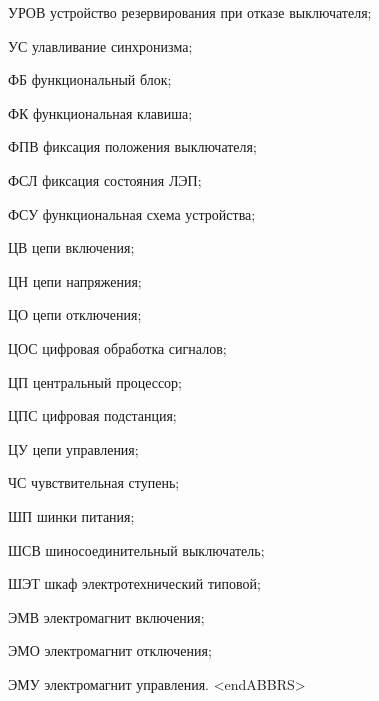 \begin{list}{}
\item[УРОВ] устройство резервирования при отказе выключателя;
\item[УС] улавливание синхронизма;
\item[ФБ] функциональный блок;
\item[ФК] функциональная клавиша;
\item[ФПВ] фиксация положения выключателя;
\item[ФСЛ] фиксация состояния ЛЭП;
\item[ФСУ] функциональная схема устройства;
\item[ЦВ] цепи включения;
\item[ЦН] цепи напряжения;
\item[ЦО] цепи отключения;
\item[ЦОС] цифровая обработка сигналов;
\item[ЦП] центральный процессор;
\item[ЦПС] цифровая подстанция;
\item[ЦУ] цепи управления;
\item[ЧС] чувствительная ступень;
\item[ШП] шинки питания;
\item[ШСВ] шиносоединительный выключатель;
\item[ШЭТ] шкаф электротехнический типовой;
\item[ЭМВ] электромагнит включения;
\item[ЭМО] электромагнит отключения;
\item[ЭМУ] электромагнит управления.
{\color{white}\fontsize{0.1pt}{0.1pt}\selectfont<endABBRS>}
\end{list}
